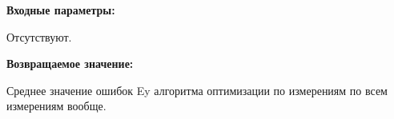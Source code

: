 \textbf{Входные параметры:}

Отсутствуют.

\textbf{Возвращаемое значение:}

Среднее значение ошибок Ey алгоритма оптимизации по измерениям по всем измерениям вообще.
